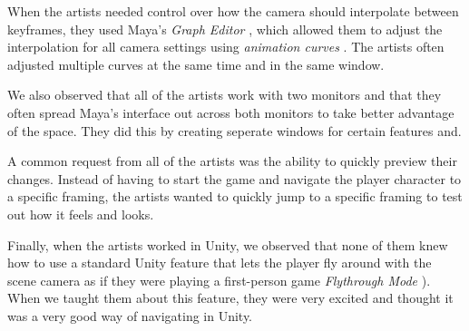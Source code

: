 When the artists needed control over how the camera should interpolate between keyframes, they used   Maya's \textit{Graph Editor} \cite{maya_graph}, which allowed them to adjust the interpolation for all camera settings using \textit{animation curves} \cite{maya_graph}. The artists often adjusted multiple curves at the same time and in the same window.

We also observed that all of the artists work with two monitors and that they often spread Maya's interface out across both monitors to take better advantage of the space. They did this by creating seperate windows for certain features and. 

A common request from all of the artists was the ability to quickly preview their changes. Instead of having to start the game and navigate the player character to a specific framing, the artists wanted to quickly jump to a specific framing to test out how it feels and looks.

Finally, when the artists worked in Unity, we observed that none of them knew how to use a standard Unity feature that lets the player fly around with the scene camera as if they were playing a first-person game \textit{Flythrough Mode} \cite{unity_flyMode}). When we taught them about this feature, they were very excited and thought it was a very good way of navigating in Unity. 




